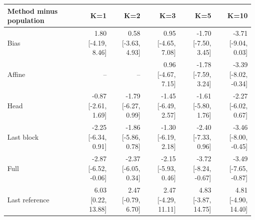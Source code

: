 \documentclass[11pt]{article}
\begin{document}
\begin{table}[!htbp]\centering\scriptsize\setlength{\tabcolsep}{3pt}
\begin{tabular}{lrrrrr}\toprule
Method minus population & K=1 & K=2 & K=3 & K=5 & K=10\\\midrule
Bias & \shortstack{1.80\\{[-4.19, 8.46]}} & \shortstack{0.58\\{[-3.63, 4.93]}} & \shortstack{0.95\\{[-4.65, 7.08]}} & \shortstack{-1.70\\{[-7.50, 3.45]}} & \shortstack{-3.71\\{[-9.04, 0.03]}}\\
Affine & -- & -- & \shortstack{0.96\\{[-4.67, 7.15]}} & \shortstack{-1.78\\{[-7.59, 3.24]}} & \shortstack{-3.39\\{[-8.02, -0.34]}}\\
Head & \shortstack{-0.87\\{[-2.61, 1.69]}} & \shortstack{-1.79\\{[-6.27, 0.99]}} & \shortstack{-1.45\\{[-6.49, 2.57]}} & \shortstack{-1.61\\{[-5.80, 1.76]}} & \shortstack{-2.27\\{[-6.02, 0.67]}}\\
Last block & \shortstack{-2.25\\{[-6.34, 0.91]}} & \shortstack{-1.86\\{[-5.86, 0.78]}} & \shortstack{-1.30\\{[-6.19, 2.18]}} & \shortstack{-2.40\\{[-7.33, 0.96]}} & \shortstack{-3.46\\{[-8.00, -0.45]}}\\
Full & \shortstack{-2.87\\{[-6.52, -0.06]}} & \shortstack{-2.37\\{[-6.05, 0.34]}} & \shortstack{-2.15\\{[-5.93, 0.46]}} & \shortstack{-3.72\\{[-8.24, -0.67]}} & \shortstack{-3.49\\{[-7.65, -0.87]}}\\
Last reference & \shortstack{6.03\\{[0.22, 13.88]}} & \shortstack{2.47\\{[-0.79, 6.70]}} & \shortstack{2.47\\{[-4.29, 11.11]}} & \shortstack{4.83\\{[-3.87, 14.75]}} & \shortstack{4.81\\{[-4.90, 14.40]}}\\

\end{tabular}
\end{table}
\end{document}

